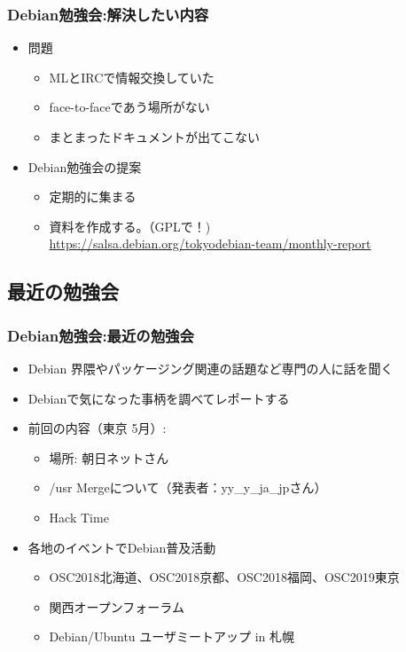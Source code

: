 \begin{frame}

\frametitle{Debian勉強会:解決したい内容}
\begin{itemize}
 \item<1-> 問題
       \begin{itemize}
	\item MLとIRCで情報交換していた
	\item face-to-faceであう場所がない
	\item まとまったドキュメントが出てこない
       \end{itemize}
 \item<2-> Debian勉強会の提案
       \begin{itemize}
	\item 定期的に集まる
	\item 資料を作成する。（GPLで！) \\
	  {\small \url{https://salsa.debian.org/tokyodebian-team/monthly-report}}
       \end{itemize}
\end{itemize}

\end{frame}


\subsection{最近の勉強会}


\begin{frame}
  
\frametitle{Debian勉強会:最近の勉強会}
  
\begin{itemize}
  \item Debian 界隈やパッケージング関連の話題など専門の人に話を聞く
  \item Debianで気になった事柄を調べてレポートする
  \item 前回の内容（東京 5月）:
	\begin{itemize}
	\item 場所: 朝日ネットさん
    \item /usr Mergeについて（発表者：yy\_y\_ja\_jpさん）
    \item Hack Time
	\end{itemize}
  \item 各地のイベントでDebian普及活動
	\begin{itemize}
      \item OSC2018北海道、OSC2018京都、OSC2018福岡、OSC2019東京
      \item 関西オープンフォーラム
	  \item Debian/Ubuntu ユーザミートアップ in 札幌
	\end{itemize}
\end{itemize}

\end{frame}

